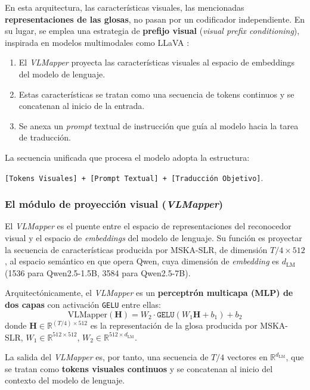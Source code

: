 En esta arquitectura, las características visuales, las mencionadas \textbf{representaciones de las glosas}, no pasan por un codificador independiente.
En su lugar, se emplea una estrategia de \textbf{prefijo visual} (\textit{visual prefix conditioning}), inspirada en modelos multimodales como LLaVA \cite{LLaVA}:
\begin{enumerate}
  \item El \textit{VLMapper} proyecta las características visuales al espacio de embeddings del modelo de lenguaje.
  \item Estas características se tratan como una secuencia de tokens continuos y se concatenan al inicio de la entrada.
  \item Se anexa un \textit{prompt} textual de instrucción que guía al modelo hacia la tarea de traducción.
\end{enumerate}
La secuencia unificada que procesa el modelo adopta la estructura:
\begin{center}
\texttt{[Tokens Visuales] + [Prompt Textual] + [Traducción Objetivo]}.
\end{center}

\subsubsection{El módulo de proyección visual (\textit{VLMapper})}
El \textit{VLMapper} es el puente entre el espacio de representaciones del reconocedor visual y el espacio de \textit{embeddings} del modelo de lenguaje.
Su función es proyectar la secuencia de características producida por MSKA-SLR, de dimensión $T/4 \times 512$, al espacio semántico en que opera Qwen, cuya dimensión de \textit{embedding} es $d_{\text{LM}}$ (1536 para Qwen2.5-1.5B, 3584 para Qwen2.5-7B).

Arquitectónicamente, el \textit{VLMapper} es un \textbf{perceptrón multicapa (MLP) de dos capas} con activación \texttt{GELU} entre ellas:
\begin{equation*}
    \text{VLMapper}(\mathbf{H}) = W_2 \cdot \texttt{GELU}(W_1 \mathbf{H} + b_1) + b_2
\end{equation*}
donde $\mathbf{H} \in \mathbb{R}^{(T/4) \times 512}$ es la representación de la glosa producida por MSKA-SLR, $W_1 \in \mathbb{R}^{512 \times 512}$, $W_2 \in \mathbb{R}^{512 \times d_{\text{LM}}}$.

La salida del \textit{VLMapper} es, por tanto, una secuencia de $T/4$ vectores en $\mathbb{R}^{d_{\text{LM}}}$, que se tratan como \textbf{tokens visuales continuos} y se concatenan al inicio del contexto del modelo de lenguaje.


